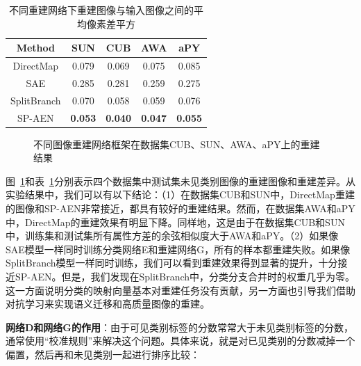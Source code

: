 \begin{table}[htbp]
\centering
\begin{tabular}{|c c| c| c| c|}
\hline
Method & \textbf{SUN} & \textbf{CUB} & \textbf{AWA} & \textbf{aPY} \\
\hline
 DirectMap & 0.079 & 0.069 & 0.075 & 0.085 \\
 SAE & 0.285 & 0.281 & 0.259 &  0.275\\
SplitBranch & 0.070 & 0.058  & 0.059 & 0.076 \\
SP-AEN & \textbf{0.053}  & \textbf{0.040}& \textbf{0.047} & \textbf{0.055} \\
\hline
\end{tabular}
\caption{不同重建网络下重建图像与输入图像之间的平均像素差平方}
\label{ch3:tab:conflict_quantitative}
\end{table}


\begin{figure}[htbp]
    \centering
    \caption{不同图像重建网络框架在数据集CUB、SUN、AWA、aPY上的重建结果}
    \label{ch3:fig:conflict_visualization}
\end{figure}

图~\ref{ch3:fig:conflict_visualization}和表~\ref{ch3:tab:conflict_quantitative}分别表示四个数据集中测试集未见类别图像的重建图像和重建差异。从实验结果中，我们可以有以下结论：（1）在数据集CUB和SUN中，DirectMap重建的图像和SP-AEN非常接近，都具有较好的重建结果。然而，在数据集AWA和aPY中，DirectMap的重建效果有明显下降。同样地，这是由于在数据集CUB和SUN中，训练集和测试集所有属性方差的余弦相似度大于AWA和aPY。（2）如果像SAE模型一样同时训练分类网络E和重建网络G，所有的样本都重建失败。如果像SplitBranch模型一样同时训练，我们可以看到重建效果得到显著的提升，十分接近SP-AEN。但是，我们发现在SplitBranch中，分类分支合并时的权重几乎为零。这一方面说明分类的映射向量基本对重建任务没有贡献，另一方面也引导我们借助对抗学习来实现语义迁移和高质量图像的重建。

\textbf{网络D和网络G的作用}：由于可见类别标签的分数常常大于未见类别标签的分数，通常使用“校准规则”来解决这个问题。具体来说，就是对已见类别的分数减掉一个偏置，然后再和未见类别一起进行排序比较：

